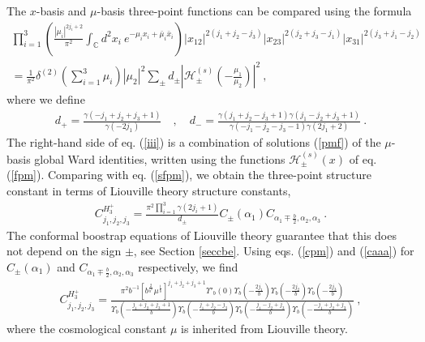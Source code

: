 \documentclass[12pt,a4paper,notitlepage]{report}
\newcommand \C {\mathbb{C}}
\numberwithin{equation}{section}
\theoremstyle{break}
\begin{document}
The $x$-basis and $\mu$-basis three-point functions can be compared using the formula \cite{rt05}
\begin{multline}
 \prod_{i=1}^3\left(\frac{|\mu_i|^{2j_i+2}}{\pi^2}\int_{\C}d^2x_i\ e^{-\mu_ix_i+\bar{\mu}_i\bar{x}_i}\right)
|x_{12}|^{2(j_1+j_2-j_3)} |x_{23}|^{2(j_2+j_3-j_1)} |x_{31}|^{2(j_3+j_1-j_2)} 
\\
= \frac{1}{\pi^2}\delta^{(2)}(\textstyle{\sum}_{i=1}^3\mu_i)|\mu_2|^2 \sum_\pm d_\pm \left|\mathcal{H}^{(s)}_\pm(-\tfrac{\mu_1}{\mu_2})\right|^2 \ ,
\label{iii}
\end{multline}
where we define 
\begin{align}
 d_+ = \frac{\gamma(-j_1+j_2+j_3+1)}{\gamma(-2j_1)} \quad , \quad d_- = \frac{\gamma(j_1+j_2-j_3+1)\gamma(j_1-j_2+j_3+1)}{\gamma(-j_1-j_2-j_3-1)\gamma(2j_1+2)}\ .
\end{align}
The right-hand side of eq. (\ref{iii}) is a combination of solutions (\ref{pmf}) of the $\mu$-basis global Ward identities, written using the functions $\mathcal{H}^{(s)}_\pm(x)$ of eq. (\ref{fpm}). Comparing with eq. (\ref{sfpm}), we obtain the three-point structure constant in terms of Liouville theory structure constants,
\begin{align}
 C^{H_3^+}_{j_1,j_2,j_3} = \frac{\pi^2\prod_{i=1}^3\gamma(2j_i+1)}{d_\pm}C_{\pm}(\alpha_1)C_{\alpha_1\mp \frac{b}{2},\alpha_2,\alpha_3}\ .
\end{align}
The conformal boostrap equations of Liouville theory guarantee that this does not depend on the sign $\pm$, see Section \ref{seccbe}.
Using eqs. (\ref{cpm}) and (\ref{caaa}) for $C_{\pm}(\alpha_1)$ and $C_{\alpha_1\mp \frac{b}{2},\alpha_2,\alpha_3}$ respectively, we find
\begin{align}
\boxed{C^{H_3^+}_{j_1,j_2,j_3} = \frac{\pi^2b^{-1}\left[b^{\frac{2}{b^2}}\mu^{\frac{1}{b}}\right]^{j_1+j_2+j_3+1} \Upsilon'_b(0)\Upsilon_b(-\frac{2j_1}{b})\Upsilon_b(-\frac{2j_2}{b})\Upsilon_b(-\frac{2j_3}{b})}
{\Upsilon_b(-\frac{j_1+j_2+j_3+1}{b})\Upsilon_b(-\frac{j_1+j_2-j_3}{b}) \Upsilon_b(-\frac{j_1-j_2+j_3}{b})\Upsilon_b(-\frac{-j_1+j_2+j_3}{b})}}\ ,
\label{chp}
\end{align}
where the cosmological constant $\mu$ is inherited from Liouville theory.
\end{document}
